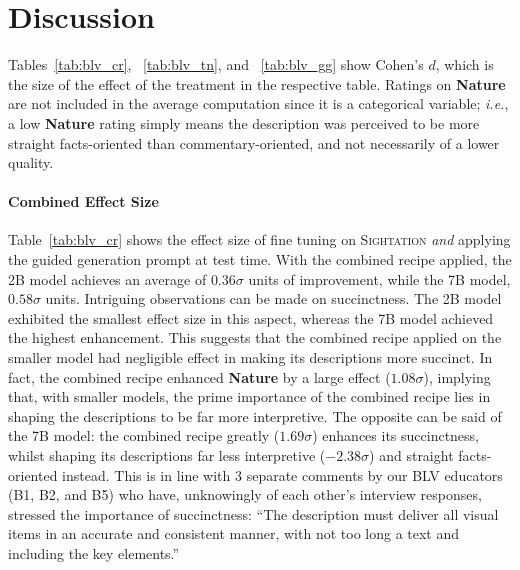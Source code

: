 \section{Discussion}\label{sec:discussion}

Tables~\ref{tab:blv_cr}, ~\ref{tab:blv_tn}, and ~\ref{tab:blv_gg} show Cohen's $d$, which is the size of the effect of the treatment in the respective table. Ratings on \textbf{Nature} are not included in the average computation since it is a categorical variable; \textit{i.e.}, a low \textbf{Nature} rating simply means the description was perceived to be more straight facts-oriented than commentary-oriented, and not necessarily of a lower quality.

\paragraph{Combined Effect Size}
Table~\ref{tab:blv_cr} shows the effect size of fine tuning on \textsc{Sightation} \textit{and} applying the guided generation prompt at test time. With the combined recipe applied, the 2B model achieves an average of $0.36\sigma$ units of improvement, while the 7B model, $0.58\sigma$ units.
Intriguing observations can be made on succinctness. The 2B model exhibited the smallest effect size in this aspect, whereas the 7B model achieved the highest enhancement. This suggests that the combined recipe applied on the smaller model had negligible effect in making its descriptions more succinct. In fact, the combined recipe enhanced \textbf{Nature} by a large effect ($1.08\sigma$), implying that, with smaller models, the prime importance of the combined recipe lies in shaping the descriptions to be far more interpretive. The opposite can be said of the 7B model: the combined recipe greatly ($1.69\sigma$) enhances its succinctness, whilst shaping its descriptions far less interpretive ($-2.38\sigma$) and straight facts-oriented instead. This is in line with 3 separate comments by our BLV educators (B1, B2, and B5) who have, unknowingly of each other's interview responses, stressed the importance of succinctness: ``The description must deliver all visual items in an accurate and consistent manner, with not too long a text and including the key elements.''

